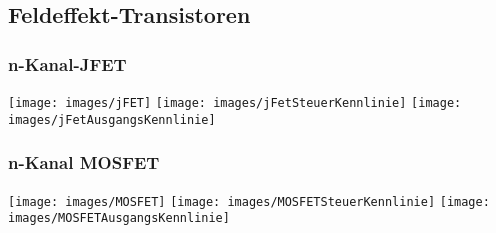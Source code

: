 \subsection{Feldeffekt-Transistoren}

\subsubsection{n-Kanal-JFET}
\texttt{[image: images/jFET]}
\texttt{[image: images/jFetSteuerKennlinie]}
\texttt{[image: images/jFetAusgangsKennlinie]}\\

\subsubsection{n-Kanal MOSFET}

\texttt{[image: images/MOSFET]}
\texttt{[image: images/MOSFETSteuerKennlinie]}
\texttt{[image: images/MOSFETAusgangsKennlinie]}\\